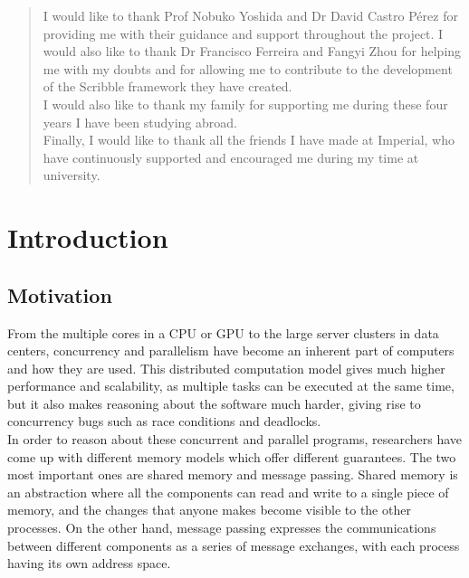 \documentclass[12pt,twoside]{report}
\begin{document}
\cleardoublepage
\renewcommand{\abstractname}{Acknowledgements}
\begin{abstract}
I would like to thank Prof Nobuko Yoshida and Dr David Castro Pérez for providing me with their guidance and support throughout the project. I would also like to thank Dr Francisco Ferreira and Fangyi Zhou for helping me with my doubts and for allowing me to contribute to the development of the Scribble framework they have created.\\

I would also like to thank my family for supporting me during these four years I have been studying abroad.\\

Finally, I would like to thank all the friends I have made at Imperial, who have continuously supported and encouraged me during my time at university.
\end{abstract}

\clearpage{\pagestyle{empty}\cleardoublepage}

\tableofcontents 


\clearpage{\pagestyle{empty}\cleardoublepage}
\setcounter{page}{1}
\fancyhead[LE,RO]{\slshape \rightmark}
\fancyhead[LO,RE]{\slshape \leftmark}

\chapter{Introduction}
\section{Motivation}

From the multiple cores in a CPU or GPU to the large server clusters in data centers, concurrency and parallelism have become an inherent part of computers and how they are used. This distributed computation model gives much higher performance and scalability, as multiple tasks can be executed at the same time, but it also makes reasoning about the software much harder, giving rise to concurrency bugs such as race conditions and deadlocks.\\

In order to reason about these concurrent and parallel programs, researchers have come up with different memory models which offer different guarantees. The two most important ones are shared memory and message passing. Shared memory is an abstraction where all the components can read and write to a single piece of memory, and the changes that anyone makes become visible to the other processes. On the other hand, message passing expresses the communications between different components as a series of message exchanges, with each process having its own address space. %
\\
\end{document}
